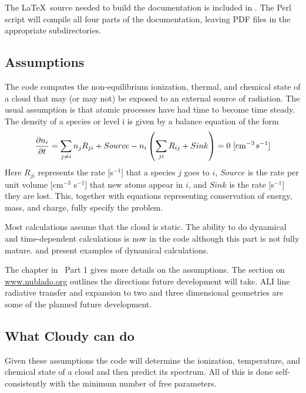 \documentclass[12pt,twoside]{article}
\begin{document}
{The \LaTeX\ source needed to build the documentation is included in .
The Perl script  will compile all four parts of the documentation,
leaving PDF files in the appropriate subdirectories.

\subsection{Assumptions}

The code computes the non-equilibrium ionization, thermal, and chemical
state of a cloud that may (or may not) be exposed to an external source
of radiation.  The usual assumption is that atomic processes have had time
to become time steady.  The density of a species or level i is given by
a balance equation of the form
\begin{equation}
\frac{\partial n_i}{\partial t} = \sum_{j \ne i} n_j R_{ji} +
  Source - n_i \left( \sum_{ji} R_{ij}  + Sink \right) = 0
  \ \rm{[cm^{-3} \, s^{-1}]}
\end{equation}
Here $R_{ji}$ represents the rate [s$^{-1}$] that a species $j$ goes to $i$,
$Source$ is
the rate per unit volume [cm$^{-3}$ s$^{-1}$]
that new atoms appear in $i$, and $Sink$
is the rate [s$^{-1}$] they are lost.  This,
together with equations representing
conservation of energy, mass, and charge, fully specify the problem.

Most calculations assume that the cloud is static.
The ability to do dynamical and time-dependent calculations is
now in the code although this part is not fully mature.
\citet{HenneyEtAl05} and \citet{HenneyEtAl07} present
examples of dynamical calculations.

The  chapter in \Hazy\ Part 1 gives more details on the assumptions.
The section  on \href{http://www.nublado.org}{www.nublado.org}
outlines the directions future development will take.
ALI line radiative transfer and expansion to two and three dimensional geometries
are some of the planned future development.

\subsection{What Cloudy can do}

Given these assumptions the code will determine the ionization,
temperature, and chemical state of a cloud and then predict its spectrum.
All of this is done self-consistently with the minimum number of free
parameters.

}
\end{document}
